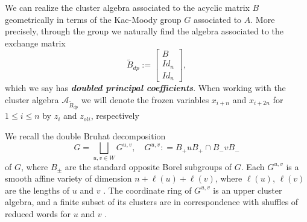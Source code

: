 \documentclass[12pt]{amsart}
\makeatletter
\newcommand{\saySS}[1]{\say[SS]{\color{blue}{\bf SS:}\;#1}}
\newcommand{\newword}[1]{\textbf{\emph{#1}}}
\newcommand{\cA}{\mathcal{A}}
\newcommand{\Bdp}{\widetilde{B}_{dp}}
\newcommand{\@doublebullet}{
  \begin{tikzpicture}[baseline={(0,-0.8ex)}]
    \fill (0,0.5ex) circle (.4ex);
    \fill (0,-0.5ex) circle (.4ex);
  \end{tikzpicture}
}
\newcommand{\doublebullet}{{\mathrel{\mathchoice
  {\hbox{\fontsize{\tf@size}{\tf@size}\selectfont\@doublebullet}}
  {\hbox{\fontsize{\tf@size}{\tf@size}\selectfont\@doublebullet}}
  {\hbox{\fontsize{\sf@size}{\sf@size}\selectfont\@doublebullet}}
  {\hbox{\fontsize{\ssf@size}{\ssf@size}\selectfont\@doublebullet}}
}}}
\theoremstyle{remark}
\numberwithin{equation}{section}
\numberwithin{figure}{section}
\makeatother
\begin{document}
We can realize the cluster algebra associated to the acyclic matrix $B$ geometrically in terms of the Kac-Moody group $G$ associated to $A$. More precisely, through the group we naturally find the algebra associated to the exchange matrix
\[
\Bdp := \begin{bmatrix} B \\ Id_n \\ Id_n \end{bmatrix},
\]
which we say has \newword{doubled principal coefficients}. When working with the cluster algebra $\cA_{\Bdp}$ we will denote the frozen variables $x_{i+n}$ and $x_{i+2n}$ for $1 \leq i \leq n$ by $z_i$ and $z_{ol{i}}$, respectively


We recall the double Bruhat decomposition
\[
G = \bigsqcup_{u,v \in W} G^{u,v},\quad G^{u,v} : = B_+ u B_+ \cap B_- v B_-
\]
of $G$, where $B_{\pm}$ are the standard opposite Borel subgroups of $G$. 
Each $G^{u,v}$ is a smooth affine variety of dimension $n + \ell(u) + \ell(v)$, where $\ell(u)$, $\ell(v)$ are the lengths of $u$ and $v$ \cite{FZ99,Wil13}. 
The coordinate ring of $G^{u,v}$ is an upper cluster algebra, and a finite subset of its clusters are in correspondence with shuffles of reduced words for $u$ and $v$ \cite{BFZ05,Wil13}. 
\end{document}
